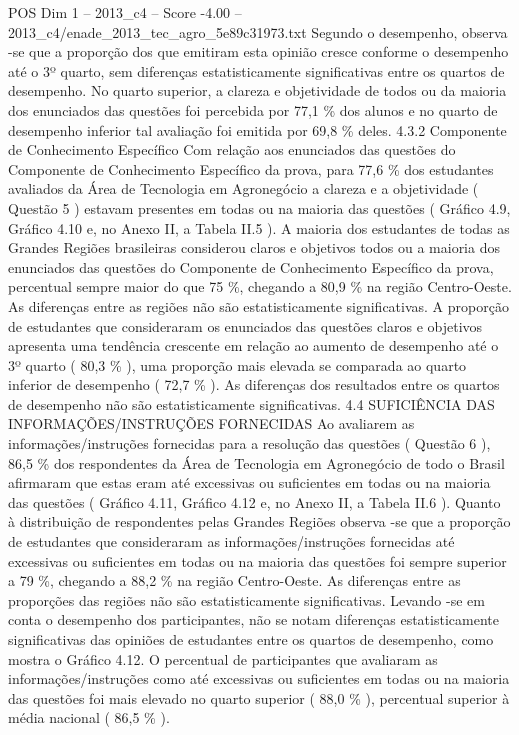 \begin{textsample}{POS Dim 1 – 2013\_c4 – Score -4.00 – 2013\_c4/enade\_2013\_tec\_agro\_5e89c31973.txt}
Segundo o desempenho, observa -se que a proporção dos que emitiram esta opinião cresce conforme o desempenho até o 3º quarto, sem diferenças estatisticamente significativas entre os quartos de desempenho.
No quarto superior, a clareza e objetividade de todos ou da maioria dos enunciados das questões foi percebida por 77,1 \% dos alunos e no quarto de desempenho inferior tal avaliação foi emitida por 69,8 \% deles. 4.3.2 Componente de Conhecimento Específico Com relação aos enunciados das questões do Componente de Conhecimento Específico da prova, para 77,6 \% dos estudantes avaliados da Área de Tecnologia em Agronegócio a clareza e a objetividade ( Questão 5 ) estavam presentes em todas ou na maioria das questões ( Gráfico 4.9, Gráfico 4.10 e, no Anexo II, a Tabela II.5 ).
A maioria dos estudantes de todas as Grandes Regiões brasileiras considerou claros e objetivos todos ou a maioria dos enunciados das questões do Componente de Conhecimento Específico da prova, percentual sempre maior do que 75 \%, chegando a 80,9 \% na região Centro-Oeste.
As diferenças entre as regiões não são estatisticamente significativas.
A proporção de estudantes que consideraram os enunciados das questões claros e objetivos apresenta uma tendência crescente em relação ao aumento de desempenho até o 3º quarto ( 80,3 \% ), uma proporção mais elevada se comparada ao quarto inferior de desempenho ( 72,7 \% ).
As diferenças dos resultados entre os quartos de desempenho não são estatisticamente significativas. 4.4 SUFICIÊNCIA DAS INFORMAÇÕES/INSTRUÇÕES FORNECIDAS Ao avaliarem as informações/instruções fornecidas para a resolução das questões ( Questão 6 ), 86,5 \% dos respondentes da Área de Tecnologia em Agronegócio de todo o Brasil afirmaram que estas eram até excessivas ou suficientes em todas ou na maioria das questões ( Gráfico 4.11, Gráfico 4.12 e, no Anexo II, a Tabela II.6 ).
Quanto à distribuição de respondentes pelas Grandes Regiões observa -se que a proporção de estudantes que consideraram as informações/instruções fornecidas até excessivas ou suficientes em todas ou na maioria das questões foi sempre superior a 79 \%, chegando a 88,2 \% na região Centro-Oeste.
As diferenças entre as proporções das regiões não são estatisticamente significativas.
Levando -se em conta o desempenho dos participantes, não se notam diferenças estatisticamente significativas das opiniões de estudantes entre os quartos de desempenho, como mostra o Gráfico 4.12.
O percentual de participantes que avaliaram as informações/instruções como até excessivas ou suficientes em todas ou na maioria das questões foi mais elevado no quarto superior ( 88,0 \% ), percentual superior à média nacional ( 86,5 \% ).

\end{textsample}
